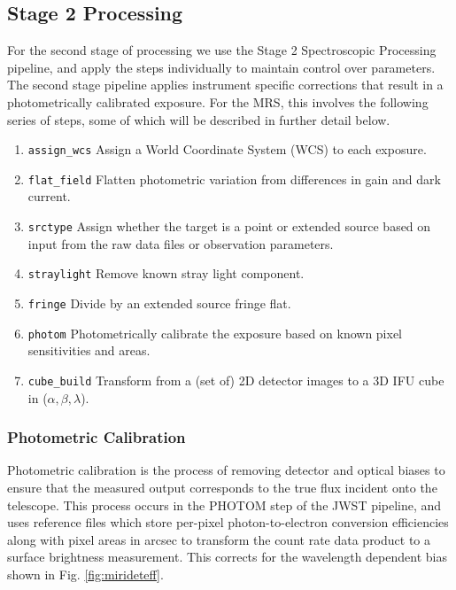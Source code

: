 \subsection{Stage 2 Processing}
For the second stage of processing we use the Stage 2 Spectroscopic Processing pipeline, and apply the steps individually to maintain control over parameters.
The second stage pipeline applies instrument specific corrections that result in a photometrically calibrated exposure. For the MRS, this involves the following series of steps, some of which will be described in further detail below.
\begin{enumerate}
	\item \verb|assign_wcs| Assign a World Coordinate System (WCS) to each exposure.
	\item \verb|flat_field| Flatten photometric variation from differences in gain and dark current.
	\item \verb|srctype| Assign whether the target is a point or extended source based on input from the raw data files or observation parameters.
	\item \verb|straylight| Remove known stray light component.
	\item \verb|fringe| Divide by an extended source fringe flat.
	\item \verb|photom| Photometrically calibrate the exposure based on known pixel sensitivities and areas.
	\item \verb|cube_build| Transform from a (set of) 2D detector images to a 3D IFU cube in ($\alpha,\beta,\lambda$).
\end{enumerate} 
\subsubsection{Photometric Calibration}
Photometric calibration is the process of removing detector and optical biases to ensure that the measured output corresponds to the true flux incident onto the telescope.
This process occurs in the PHOTOM step of the JWST pipeline, and uses reference files which store per-pixel photon-to-electron conversion efficiencies along with pixel areas in arcsec to transform the count rate data product to a surface brightness measurement.
This corrects for the wavelength dependent bias shown in Fig. \ref{fig:mirideteff}.

